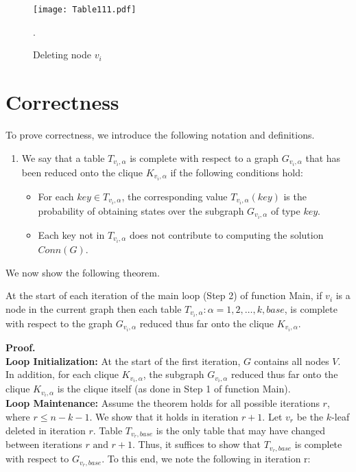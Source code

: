 \begin{figure}[!htb]
\centering
\texttt{[image: Table111.pdf]}
 \caption{ Deleting node $v_i$}.
 \label{fig:table2}
\end{figure}
\section{Correctness}
\label{Sec:crtns}
To prove correctness, we introduce the following notation and definitions.
\begin{enumerate}
\item[{\bf [D1]}]We say that a table $T_{v_i,\alpha}$ is complete with respect to a graph $G_{v_i,\alpha}$ that has been reduced onto the clique $K_{v_i,\alpha}$ if the following conditions hold:
%
\begin{itemize}
%
\item[a)] For each $key\in T_{v_i,\alpha}$, the corresponding value $T_{v_i,\alpha}(key)$ is the probability of obtaining states over the subgraph $G_{v_i,\alpha}$ of type $key$.
%
\item[b)] Each key not in $T_{v_i,\alpha}$ does not contribute to computing the solution $Conn(G)$.
\end{itemize}
%
\end{enumerate}
\nwline
We now show the following theorem.


\begin{theorem} \label{thm:correctnessch4}
\normalfont
At the start of each iteration of the main loop (Step 2) of function Main, if $v_i$ is a node in the current graph then each table $T_{v_i,\alpha}: \alpha=1, 2, \ldots, k, base$, is complete with respect to the graph $G_{v_i,\alpha}$ reduced thus far onto the clique $K_{v_i,\alpha}$.
\end{theorem}
\nwline
\textbf{Proof.}\\
\textbf{Loop Initialization:} At the start of the first iteration, $G$ contains all nodes $V$.
%
In addition, for each clique $K_{v_i,\alpha}$, the subgraph $G_{v_i,\alpha}$ reduced thus far onto the clique $K_{v_i,\alpha}$ is the clique itself (as done in Step 1 of function Main).\\
\nwline
\textbf{Loop Maintenance:} Assume the theorem holds for all possible iterations $r$, where $r\leq n-k-1$. We show that it holds in iteration $r+1$. Let $v_r$ be the $k$-leaf deleted in iteration $r$.
%
Table $T_{v_r,base}$ is the only table that may have changed between iterations $r \mbox{ and } r+1$. 
%
Thus, it suffices to show that $T_{v_r,base}$ is complete with respect to $G_{v_r,base}$. To this end, we note the following in iteration r:


